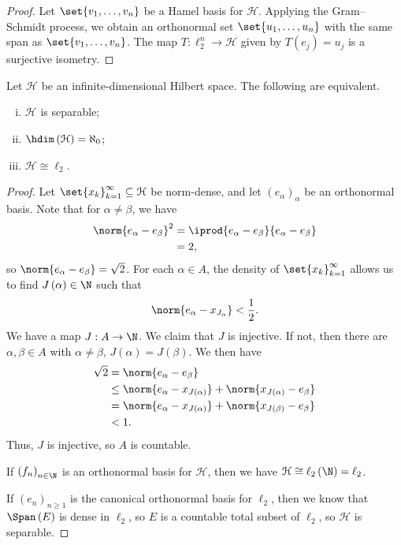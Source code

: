 \documentclass[10pt]{mypackage}
\begin{document}
\begin{proof}
  Let $\set{v_1,\dots,v_n}$ be a Hamel basis for $\mathcal{H}$. Applying the Gram--Schmidt process, we obtain an orthonormal set $\set{u_1,\dots,u_n}$ with the same span as $\set{v_1,\dots,v_n}$. The map $T\colon \ell_{2}^{n}\rightarrow \mathcal{H}$ given by $T\left(e_j\right) = u_j$ is a surjective isometry.
\end{proof}
\begin{proposition}
  Let $\mathcal{H}$ be an infinite-dimensional Hilbert space. The following are equivalent.
  \begin{enumerate}[(i)]
    \item $\mathcal{H}$ is separable;
    \item $\hdim\left(\mathcal{H}\right) = \aleph_0$;
    \item $\mathcal{H}\cong \ell_2$.
  \end{enumerate}
\end{proposition}
\begin{proof}
  Let $\set{x_k}_{k=1}^{\infty}\subseteq \mathcal{H}$ be norm-dense, and let $\left(e_{\alpha}\right)_{\alpha}$ be an orthonormal basis. Note that for $\alpha \neq \beta$, we have
  \begin{align*}
    \norm{e_{\alpha} - e_{\beta}}^2 &= \iprod{e_{\alpha} - e_{\beta}}{e_{\alpha} - e_{\beta}}\\
                                    &= 2,
  \end{align*}
  so $\norm{e_{\alpha} - e_{\beta}} = \sqrt{2}$. For each $\alpha \in A$, the density of $\set{x_k}_{k=1}^{\infty}$ allows us to find $J\left(\alpha\right)\in \N$ such that
  \begin{align*}
    \norm{e_{\alpha} - x_{J_{\alpha}}} < \frac{1}{2}.
  \end{align*}
  We have a map $J: A\rightarrow \N$. We claim that $J$ is injective. If not, then there are $\alpha,\beta \in A$ with $\alpha\neq \beta$, $J\left(\alpha\right) = J\left(\beta\right)$. We then have
  \begin{align*}
    \sqrt{2} &= \norm{e_{\alpha} - e_{\beta}}\\
             &\leq \norm{e_{\alpha} - x_{J\left(\alpha\right)}} + \norm{x_{J\left(\alpha\right)} - e_{\beta}}\\
             &= \norm{e_{\alpha} - x_{J\left(\alpha\right)}} + \norm{x_{J\left(\beta\right)} - e_{\beta}}\\
             &< 1.
  \end{align*}
  Thus, $J$ is injective, so $A$ is countable.\newline

  If $\left(f_n\right)_{n\in \N}$ is an orthonormal basis for $\mathcal{H}$, then we have $\mathcal{H} \cong \ell_2\left(\N\right) = \ell_2$.\newline

  If $\left(e_n\right)_{n\geq 1}$ is the canonical orthonormal basis for $\ell_2$, then we know that $\Span\left(E\right)$ is dense in $\ell_2$, so $E$ is a countable total subset of $\ell_2$, so $\mathcal{H}$ is separable.
\end{proof}
\end{document}
